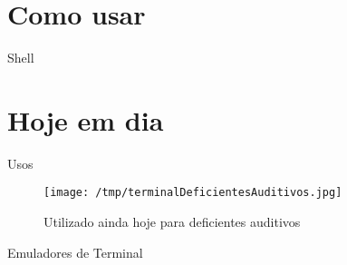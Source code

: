 \documentclass[presentation,aspectratio=169,14pt]{beamer}
\begin{document}
\section{Como usar}
\label{sec:org613a5bd}
\begin{frame}[label={sec:org8e67b50}]{Shell}
\end{frame}
\section{Hoje em dia}
\label{sec:org0543f1e}
\begin{frame}[label={sec:orga932dda}]{Usos}
\begin{figure}[htbp]
\centering
\texttt{[image: /tmp/terminalDeficientesAuditivos.jpg]}
\caption{Utilizado ainda hoje para deficientes auditivos}
\end{figure}
\end{frame}
\begin{frame}[label={sec:orgfcfcb5e}]{Emuladores de Terminal}
\end{frame}
\end{document}
